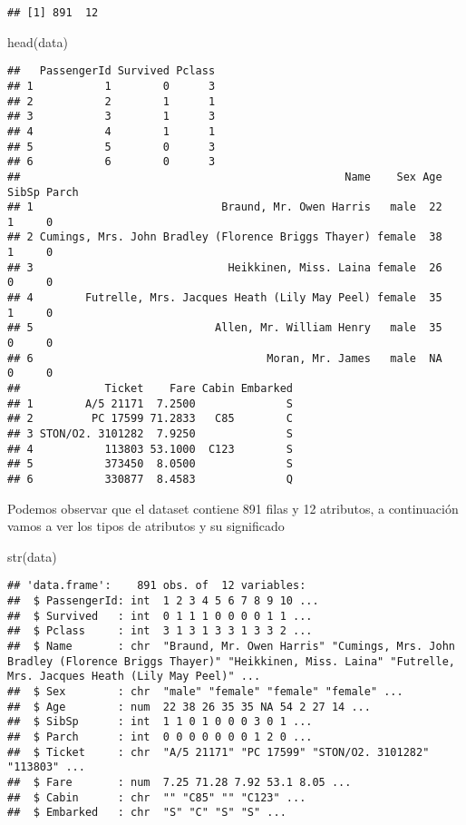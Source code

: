 \documentclass[
]{article}
\newenvironment{Shaded}{\begin{snugshade}}{\end{snugshade}}
\newcommand{\FunctionTok}[1]{\textcolor[rgb]{0.94,0.94,0.56}{#1}}
\newcommand{\NormalTok}[1]{\textcolor[rgb]{0.80,0.80,0.80}{#1}}
\begin{document}
\begin{verbatim}
## [1] 891  12
\end{verbatim}

\begin{Shaded}
\begin{Highlighting}[]
\FunctionTok{head}\NormalTok{(data)}
\end{Highlighting}
\end{Shaded}

\begin{verbatim}
##   PassengerId Survived Pclass
## 1           1        0      3
## 2           2        1      1
## 3           3        1      3
## 4           4        1      1
## 5           5        0      3
## 6           6        0      3
##                                                  Name    Sex Age SibSp Parch
## 1                             Braund, Mr. Owen Harris   male  22     1     0
## 2 Cumings, Mrs. John Bradley (Florence Briggs Thayer) female  38     1     0
## 3                              Heikkinen, Miss. Laina female  26     0     0
## 4        Futrelle, Mrs. Jacques Heath (Lily May Peel) female  35     1     0
## 5                            Allen, Mr. William Henry   male  35     0     0
## 6                                    Moran, Mr. James   male  NA     0     0
##             Ticket    Fare Cabin Embarked
## 1        A/5 21171  7.2500              S
## 2         PC 17599 71.2833   C85        C
## 3 STON/O2. 3101282  7.9250              S
## 4           113803 53.1000  C123        S
## 5           373450  8.0500              S
## 6           330877  8.4583              Q
\end{verbatim}

Podemos observar que el dataset contiene 891 filas y 12 atributos, a
continuación vamos a ver los tipos de atributos y su significado

\begin{Shaded}
\begin{Highlighting}[]
\FunctionTok{str}\NormalTok{(data)}
\end{Highlighting}
\end{Shaded}

\begin{verbatim}
## 'data.frame':    891 obs. of  12 variables:
##  $ PassengerId: int  1 2 3 4 5 6 7 8 9 10 ...
##  $ Survived   : int  0 1 1 1 0 0 0 0 1 1 ...
##  $ Pclass     : int  3 1 3 1 3 3 1 3 3 2 ...
##  $ Name       : chr  "Braund, Mr. Owen Harris" "Cumings, Mrs. John Bradley (Florence Briggs Thayer)" "Heikkinen, Miss. Laina" "Futrelle, Mrs. Jacques Heath (Lily May Peel)" ...
##  $ Sex        : chr  "male" "female" "female" "female" ...
##  $ Age        : num  22 38 26 35 35 NA 54 2 27 14 ...
##  $ SibSp      : int  1 1 0 1 0 0 0 3 0 1 ...
##  $ Parch      : int  0 0 0 0 0 0 0 1 2 0 ...
##  $ Ticket     : chr  "A/5 21171" "PC 17599" "STON/O2. 3101282" "113803" ...
##  $ Fare       : num  7.25 71.28 7.92 53.1 8.05 ...
##  $ Cabin      : chr  "" "C85" "" "C123" ...
##  $ Embarked   : chr  "S" "C" "S" "S" ...
\end{verbatim}
\end{document}
